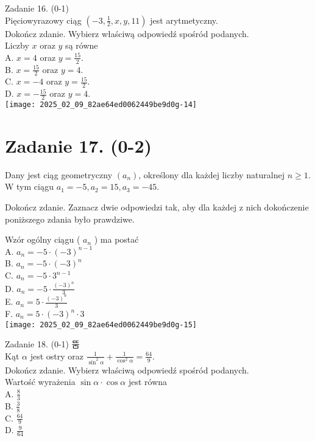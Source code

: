 \documentclass[10pt]{article}
\begin{document}
Zadanie 16. (0-1)\\
Pięciowyrazowy ciąg \(\left(-3, \frac{1}{2}, x, y, 11\right)\) jest arytmetyczny.\\
Dokończ zdanie. Wybierz właściwą odpowiedź spośród podanych.\\
Liczby \(x\) oraz \(y\) są równe\\
A. \(x=4\) oraz \(y=\frac{15}{2}\).\\
B. \(x=\frac{15}{2}\) oraz \(y=4\).\\
C. \(x=-4\) oraz \(y=\frac{15}{2}\).\\
D. \(x=-\frac{15}{2}\) oraz \(y=4\).\\
\texttt{[image: 2025\_02\_09\_82ae64ed0062449be9d0g-14]}

\section*{Zadanie 17. (0-2)}
Dany jest ciąg geometryczny \(\left(a_{n}\right)\), określony dla każdej liczby naturalnej \(n \geq 1\).\\
W tym ciągu \(a_{1}=-5, a_{2}=15, a_{3}=-45\).

Dokończ zdanie. Zaznacz dwie odpowiedzi tak, aby dla każdej z nich dokończenie poniższego zdania było prawdziwe.

Wzór ogólny ciągu ( \(a_{n}\) ) ma postać\\
A. \(a_{n}=-5 \cdot(-3)^{n-1}\)\\
B. \(a_{n}=-5 \cdot(-3)^{n}\)\\
C. \(a_{n}=-5 \cdot 3^{n-1}\)\\
D. \(a_{n}=-5 \cdot \frac{(-3)^{n}}{3}\)\\
E. \(a_{n}=5 \cdot \frac{(-3)^{n}}{3}\)\\
F. \(a_{n}=5 \cdot(-3)^{n} \cdot 3\)\\
\texttt{[image: 2025\_02\_09\_82ae64ed0062449be9d0g-15]}

Zadanie 18. (0-1) 뚬\\
Kąt \(\alpha\) jest ostry oraz \(\frac{1}{\sin ^{2} \alpha}+\frac{1}{\cos ^{2} \alpha}=\frac{64}{9}\).\\
Dokończ zdanie. Wybierz właściwą odpowiedź spośród podanych.\\
Wartość wyrażenia \(\sin \alpha \cdot \cos \alpha\) jest równa\\
A. \(\frac{8}{3}\)\\
B. \(\frac{3}{8}\)\\
C. \(\frac{64}{9}\)\\
D. \(\frac{9}{64}\)
\end{document}

